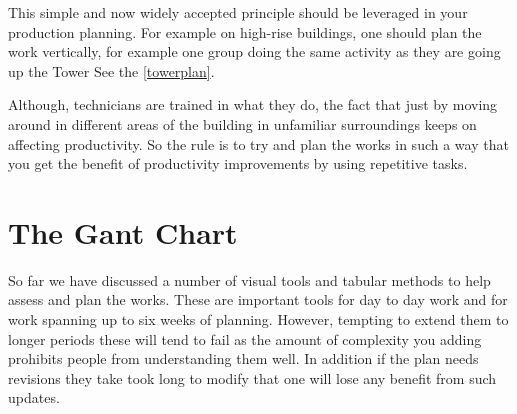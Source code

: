 This simple and now widely accepted principle should be leveraged in your
production planning. For example on high-rise buildings, one should plan
the work vertically, for example one group doing the same activity as they
are going up the Tower See the \ref{towerplan}.

Although, technicians are trained in what they do, the fact that just by moving
around in different areas of the building in unfamiliar surroundings keeps
on affecting productivity. So the rule is to try and plan the works in such
a way that you get the benefit of productivity improvements by using 
repetitive tasks.

\section*{The Gant Chart}

So far we have discussed a number of visual tools and tabular methods to help
assess and plan the works. These are important tools for day to day work and
for work spanning up to six weeks of planning. However, tempting to extend them
to longer periods these will tend to fail as the amount of complexity you adding
prohibits people from understanding them well. In addition if the plan needs
revisions they take took long to modify that one will lose any benefit from
such updates.




